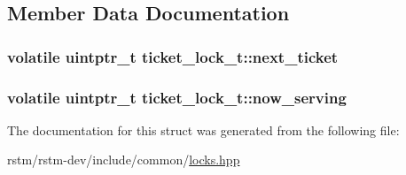 \subsection{Member Data Documentation}
\hypertarget{structticket__lock__t_a7bdc2eff47cf30738409cacb9431ce23}{
\subsubsection[{next\-\_\-ticket}]{\setlength{\rightskip}{0pt plus 5cm}volatile uintptr\-\_\-t ticket\-\_\-lock\-\_\-t\-::next\-\_\-ticket}}\label{structticket__lock__t_a7bdc2eff47cf30738409cacb9431ce23}
\hypertarget{structticket__lock__t_a4204094477dcb3a7c481bf83e4b8975c}{
\subsubsection[{now\-\_\-serving}]{\setlength{\rightskip}{0pt plus 5cm}volatile uintptr\-\_\-t ticket\-\_\-lock\-\_\-t\-::now\-\_\-serving}}\label{structticket__lock__t_a4204094477dcb3a7c481bf83e4b8975c}


The documentation for this struct was generated from the following file\-:\begin{DoxyCompactItemize}
\item 
rstm/rstm-\/dev/include/common/\hyperlink{locks_8hpp}{locks.\-hpp}\end{DoxyCompactItemize}

